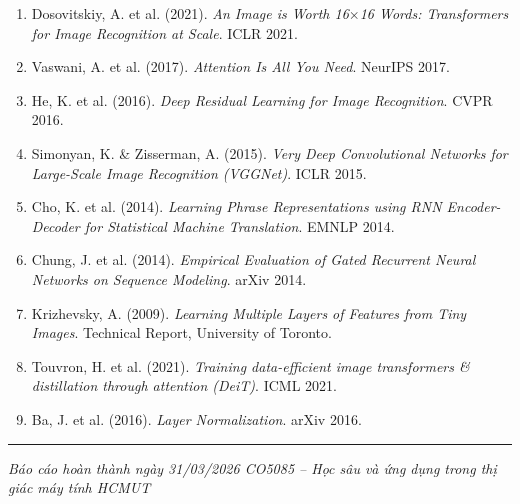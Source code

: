 \documentclass[12pt, a4paper]{article}
\begin{document}
\begin{enumerate}
  \item Dosovitskiy, A. et al. (2021). \textit{An Image is Worth 16$\times$16 Words: Transformers for Image Recognition at Scale}. ICLR 2021.
  \item Vaswani, A. et al. (2017). \textit{Attention Is All You Need}. NeurIPS 2017.
  \item He, K. et al. (2016). \textit{Deep Residual Learning for Image Recognition}. CVPR 2016.
  \item Simonyan, K. \& Zisserman, A. (2015). \textit{Very Deep Convolutional Networks for Large-Scale Image Recognition (VGGNet)}. ICLR 2015.
  \item Cho, K. et al. (2014). \textit{Learning Phrase Representations using RNN Encoder-Decoder for Statistical Machine Translation}. EMNLP 2014.
  \item Chung, J. et al. (2014). \textit{Empirical Evaluation of Gated Recurrent Neural Networks on Sequence Modeling}. arXiv 2014.
  \item Krizhevsky, A. (2009). \textit{Learning Multiple Layers of Features from Tiny Images}. Technical Report, University of Toronto.
  \item Touvron, H. et al. (2021). \textit{Training data-efficient image transformers \& distillation through attention (DeiT)}. ICML 2021.
  \item Ba, J. et al. (2016). \textit{Layer Normalization}. arXiv 2016.
\end{enumerate}

\vspace{2em}
\hrule
\vspace{0.5em}
\small\textit{Báo cáo hoàn thành ngày 31/03/2026 \textbar{} CO5085 – Học sâu và ứng dụng trong thị giác máy tính \textbar{} HCMUT}
\end{document}
